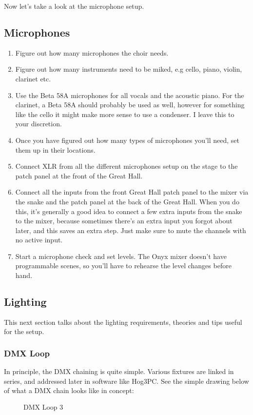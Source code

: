 \documentclass[letterpaper,10pt,oneside,headsepline]{scrreprt}
\begin{document}
Now let's take a look at the microphone setup.

\subsection{Microphones}

\begin{enumerate}
\item Figure out how many microphones the choir needs.
\item Figure out how many instruments need to be miked, e.g cello, piano, violin, clarinet etc.
\item Use the Beta 58A microphones for all vocals and the acoustic piano. For the clarinet, a Beta 58A should probably be used as well, however for something like the cello it might make more sense to use a condenser. I leave this to your discretion.
\item Once you have figured out how many types of microphones you'll need, set them up in their locations.
\item Connect XLR from all the different microphones setup on the stage to the patch panel at the front of the Great Hall.
\item Connect all the inputs from the front Great Hall patch panel to the mixer via the snake and the patch panel at the back of the Great Hall. When you do this, it's generally a good idea to connect a few extra inputs from the snake to the mixer, because sometimes there's an extra input you forgot about later, and this saves an extra step. Just make sure to mute the channels with no active input.
\item Start a microphone check and set levels. The Onyx mixer doesn't have programmable scenes, so you'll have to rehearse the level changes before hand.
\end{enumerate}
\subsection{Lighting}
This next section talks about the lighting requirements, theories and tips useful for the setup.
\subsubsection{DMX Loop}
In principle, the DMX chaining is quite simple. Various fixtures are linked in series, and addressed later in software like Hog3PC. See the simple drawing below of what a DMX chain looks like in concept:
\begin{figure}[ht]
\caption{DMX Loop 3}
\end{figure}
\end{document}

